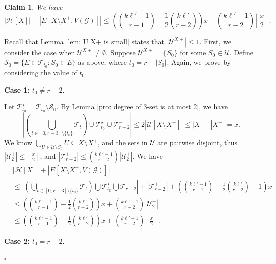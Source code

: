 \documentclass[12pt]{article}%
\newtheorem{claim}[theorem]{Claim}
\newenvironment{proof}{{\noindent\it Proof.}}{\hfill $\square$\par}
\newcommand{\mh}{\mathcal{H}}
\newcommand{\mg}{\mathcal{G}}
\begin{document}
\begin{claim}\label{XX+,X}
We have
    $$|\mh[X]|+|E[X\setminus X^{+},V(\mg)]|\leq \left(\binom{k\ell'-1}{r-1}-\frac{1}{2}\binom{k\ell'}{r-2}\right)x+\binom{k\ell'-1}{r-2}\left\lfloor\frac{x}{2}\right\rfloor.$$
\end{claim}
\begin{proof}
Recall that Lemma \ref{lem: U X+ is small} states that
$|\mathcal{U}^{X+}|\leq 1$. First, we consider the case when $\mathcal{U}^{X+}\neq \emptyset$.
Suppose $\mathcal{U}^{X+}=\{S_0\}$ for some $S_0\in\mathcal{U}$.  Define $\mathcal{S}_0=\{E\in\mathcal{T}_{t_0}: S_0\in E\}$ as above, where $t_0=r-|S_0|$. Again, we prove by considering the value of $t_0$.
\par\noindent
\textbf{Case 1:} $t_0\neq r-2$.

Let $\mathcal{T}_{t_0}^\star=\mathcal{T}_{t_0}\setminus\mathcal{S}_0$. By Lemma \ref{pro: degree of 3-set is at most 2}, we have
\begin{equation*}\label{eq: when t_0 neq r-2}
    \left|\left(\bigcup_{t\in[0,r-3]\setminus\{t_0\}}\mathcal{T}_t\right)\cup \mathcal{T}_{t_0}^{\star}\cup\mathcal{T}_{r-2}^-\right|\leq 2|\mathcal{U}[X\setminus X^+]|\leq|X|-|X^+|=x.
\end{equation*}
We know $\bigcup_{U\in \mathcal{U}\setminus S_0}U\subseteq X\setminus X^{+}$, and the sets in $\mathcal{U}$ are pairwise disjoint, thus $|\mathcal{U}_{2}^{+}|\leq \left\lfloor\frac{x}{2}\right\rfloor$, and $|\mathcal{T}_{r-2}^+|\leq \binom{k\ell'-1}{r-2}|\mathcal{U}_2^+|$. We have
\begin{equation*}
    \begin{aligned}
        &|\mh[X]|+|E[X\setminus X^+,V(\mg)]|\\
        &\leq \left|\left(\bigcup_{t\in[0,r-3]\setminus\{t_0\}}\mathcal{T}_t\right)\bigcup \mathcal{T}_{t_0}^{\star}\bigcup\mathcal{T}_{r-2}^-\right|+\left|\mathcal{T}_{r-2}^+\right|+\left(\binom{k\ell'-1}{r-1}-\frac{1}{2}\binom{k\ell'}{r-2}-1\right)x\\
        &\leq  \left(\binom{k\ell'-1}{r-1}-\frac{1}{2}\binom{k\ell'}{r-2}\right)x+\binom{k\ell'-1}{r-2}\left|\mathcal{U}_2^+\right|\\
        &\leq  \left(\binom{k\ell'-1}{r-1}-\frac{1}{2}\binom{k\ell'}{r-2}\right)x+\binom{k\ell'-1}{r-2}\left\lfloor\frac{x}{2}\right\rfloor.
    \end{aligned}
\end{equation*}
\par\noindent
\textbf{Case 2:} $t_0=r-2$.


\end{proof}
\end{document}
